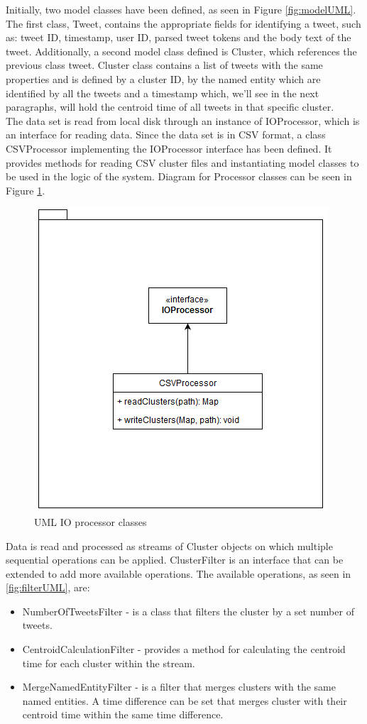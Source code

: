 \documentclass[a4paper,portrait,12pt]{article}
\begin{document}
Initially, two model classes have been defined, as seen in Figure \ref{fig:modelUML}. The first class, Tweet, contains the appropriate fields for identifying a tweet, such as: tweet ID, timestamp, user ID, parsed tweet tokens and the body text of the tweet.
Additionally, a second model class defined is Cluster, which references the previous class tweet. Cluster class contains a list of tweets with the same properties and is defined by a cluster ID, by the named entity which are identified by all the tweets and a timestamp which, we'll see in the next paragraphs, will hold the centroid time of all tweets in that specific cluster.\\

The data set is read from local disk through an instance of IOProcessor, which is an interface for reading data.
Since the data set is in CSV format, a class CSVProcessor implementing the IOProcessor interface has been defined.
It provides methods for reading CSV cluster files and instantiating model classes to be used in the logic of the system.
Diagram for Processor classes can be seen in Figure \ref{fig:processorUML}. \\

\begin{figure}[h!]
	\centering
	\includegraphics[width=0.5\linewidth]{images/processorUML.png}
	\caption{UML IO processor classes}
	\label{fig:processorUML}
\end{figure}

Data is read and processed as streams of Cluster objects on which multiple sequential operations can be applied.
ClusterFilter is an interface that can be extended to add more available operations. The available operations, as seen in \ref{fig:filterUML}, are:
\begin{itemize}
	\item NumberOfTweetsFilter - is a class that filters the cluster by a set number of tweets.
	\item CentroidCalculationFilter - provides a method for calculating the centroid time for each cluster within the stream.
	\item MergeNamedEntityFilter - is a filter that merges clusters with the same named entities. A time difference can be set that merges cluster with their centroid time within the same time difference.
\end{itemize}
\end{document}
